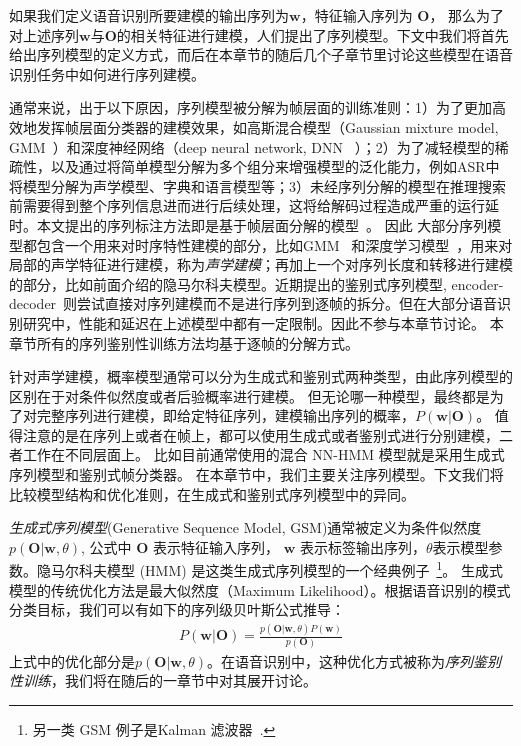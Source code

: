 如果我们定义语音识别所要建模的输出序列为$\mathbf w$，特征输入序列为 ${\mathbf O}$，
那么为了对上述序列$\mathbf w$与${\mathbf O}$的相关特征进行建模，人们提出了序列模型。下文中我们将首先给出序列模型的定义方式，而后在本章节的随后几个子章节里讨论这些模型在语音识别任务中如何进行序列建模。

通常来说，出于以下原因，序列模型被分解为帧层面的训练准则：1）为了更加高效地发挥帧层面分类器的建模效果，如高斯混合模型（Gaussian mixture model, GMM~\cite{woodland1994large}）和深度神经网络（deep neural network, DNN ~\cite{hinton2012deep}）；2）为了减轻模型的稀疏性，以及通过将简单模型分解为多个组分来增强模型的泛化能力，例如ASR中将模型分解为声学模型、字典和语言模型等；3）未经序列分解的模型在推理搜索前需要得到整个序列信息进而进行后续处理，这将给解码过程造成严重的运行延时。本文提出的序列标注方法即是基于帧层面分解的模型~\cite{forney1973viterbi,mohri2002weighted}。
因此
大部分序列模型都包含一个用来对时序特性建模的部分，比如GMM~\cite{woodland1994large} 和深度学习模型~\cite{hinton2012deep}，用来对局部的声学特征进行建模，称为{\em 声学建模}；再加上一个对序列长度和转移进行建模的部分，比如前面介绍的隐马尔科夫模型。近期提出的鉴别式序列模型, encoder-decoder~\cite{chan2016end}则尝试直接对序列建模而不是进行序列到逐帧的拆分。但在大部分语音识别研究中，性能和延迟在上述模型中都有一定限制。因此不参与本章节讨论。
本章节所有的序列鉴别性训练方法均基于逐帧的分解方式。

针对声学建模，概率模型通常可以分为生成式和鉴别式两种类型，由此序列模型的区别在于对条件似然度或者后验概率进行建模。
但无论哪一种模型，最终都是为了对完整序列进行建模，即给定特征序列，建模输出序列的概率，$P(\mathbf{w}|\mathbf{O})$。
值得注意的是在序列上或者在帧上，都可以使用生成式或者鉴别式进行分别建模，二者工作在不同层面上。
比如目前通常使用的混合 NN-HMM 模型就是采用生成式序列模型和鉴别式帧分类器。
在本章节中，我们主要关注序列模型。下文我们将比较模型结构和优化准则，在生成式和鉴别式序列模型中的异同。


{\em 生成式序列模型}(Generative Sequence Model, GSM)通常被定义为条件似然度$p(\mathbf{O}|\mathbf{w}, \theta)$, 公式中 ${\mathbf O}$ 表示特征输入序列， $\mathbf w$ 表示标签输出序列，$\theta$表示模型参数。隐马尔科夫模型 (HMM) 是这类生成式序列模型的一个经典例子~\footnote{另一类 GSM 例子是Kalman 滤波器~\cite{digalakis1991dynamical,abbeel2005discriminative}.}。
生成式模型的传统优化方法是最大似然度（Maximum Likelihood）。根据语音识别的模式分类目标，我们可以有如下的序列级贝叶斯公式推导：
\begin{equation}
\begin{split}
P(\mathbf{w}|\mathbf{O})=\frac {p(\mathbf{O}|\mathbf{w},\theta)P(\mathbf{w})}{p(\mathbf{O})}  
\end{split}
\end{equation}
上式中的优化部分是$p(\mathbf{O}|\mathbf{w},\theta)$。在语音识别中，这种优化方式被称为{\em 序列鉴别性训练}，我们将在随后的一章节中对其展开讨论。



